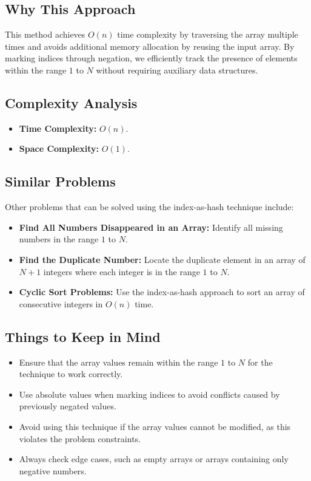\subsection*{Why This Approach}
This method achieves \( O(n) \) time complexity by traversing the array multiple times and avoids additional memory allocation by reusing the input array. By marking indices through negation, we efficiently track the presence of elements within the range \( 1 \) to \( N \) without requiring auxiliary data structures.

\subsection*{Complexity Analysis}
\begin{itemize}
    \item \textbf{Time Complexity:} \( O(n) \).
    \item \textbf{Space Complexity:} \( O(1) \).
\end{itemize}

\subsection*{Similar Problems}
Other problems that can be solved using the index-as-hash technique include:
\begin{itemize}
    \item \textbf{Find All Numbers Disappeared in an Array:} Identify all missing numbers in the range \( 1 \) to \( N \).
    \item \textbf{Find the Duplicate Number:} Locate the duplicate element in an array of \( N+1 \) integers where each integer is in the range \( 1 \) to \( N \).
    \item \textbf{Cyclic Sort Problems:} Use the index-as-hash approach to sort an array of consecutive integers in \( O(n) \) time.
\end{itemize}

\subsection*{Things to Keep in Mind}
\begin{itemize}
    \item Ensure that the array values remain within the range \( 1 \) to \( N \) for the technique to work correctly.
    \item Use absolute values when marking indices to avoid conflicts caused by previously negated values.
    \item Avoid using this technique if the array values cannot be modified, as this violates the problem constraints.
    \item Always check edge cases, such as empty arrays or arrays containing only negative numbers.
\end{itemize}

